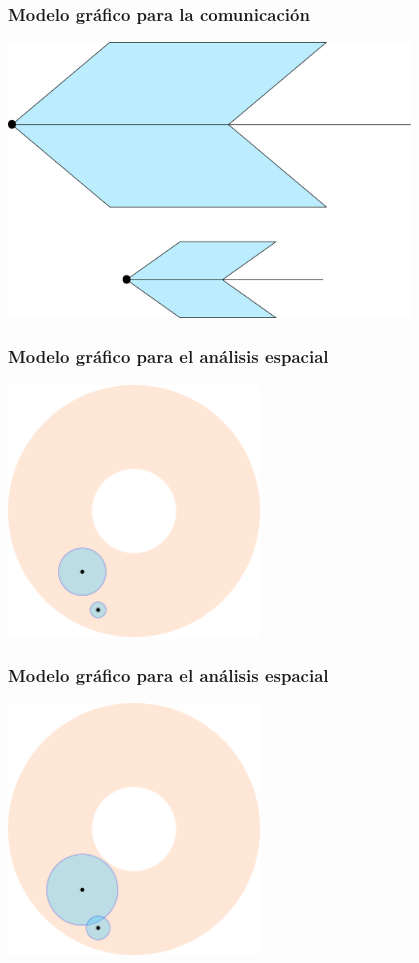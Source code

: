 \documentclass[handout]{beamer}
\theoremstyle{plain}
\theoremstyle{definition}
\theoremstyle{remark}
\begin{document}
\begin{frame}\frametitle{Modelo gráfico para la comunicación}
\centering
\includegraphics[width=0.8\textwidth]{g5579.png}
\end{frame}



\begin{frame}\frametitle{Modelo gráfico para el análisis espacial}
\centering
\includegraphics[width=0.5\textwidth]{path5812.png}
\end{frame}

\begin{frame}\frametitle{Modelo gráfico para el análisis espacial}
\centering
\includegraphics[width=0.5\textwidth]{path5813.png}
\end{frame}
\end{document}
